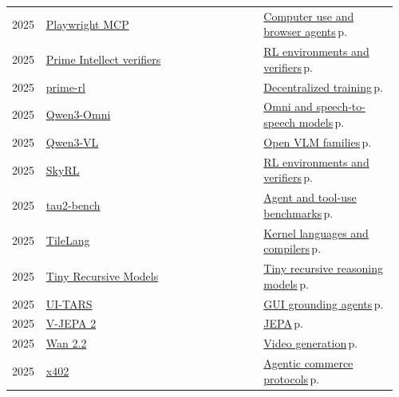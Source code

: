 \documentclass[10pt,a4paper,openany]{report}
\begin{document}
{\begin{longtable}{@{}p{0.07\linewidth}>{\raggedright}p{0.55\linewidth}>{\raggedright\arraybackslash}p{0.34\linewidth}@{}}
2025 & \href{https://github.com/microsoft/playwright-mcp}{Playwright MCP} & \hyperref[c:agents-9]{Computer use and browser agents}\,{\color{muted}\scriptsize p.\,\pageref{c:agents-9}}\\
2025 & \href{https://github.com/PrimeIntellect-ai/verifiers}{Prime Intellect verifiers} & \hyperref[c:reasoning-5]{RL environments and verifiers}\,{\color{muted}\scriptsize p.\,\pageref{c:reasoning-5}}\\
2025 & \href{https://github.com/PrimeIntellect-ai/prime-rl}{prime-rl} & \hyperref[c:training-8]{Decentralized training}\,{\color{muted}\scriptsize p.\,\pageref{c:training-8}}\\
2025 & \href{https://github.com/QwenLM/Qwen3-Omni}{Qwen3-Omni} & \hyperref[c:vlm-7]{Omni and speech-to-speech models}\,{\color{muted}\scriptsize p.\,\pageref{c:vlm-7}}\\
2025 & \href{https://github.com/QwenLM/Qwen3-VL}{Qwen3-VL} & \hyperref[c:vlm-1]{Open VLM families}\,{\color{muted}\scriptsize p.\,\pageref{c:vlm-1}}\\
2025 & \href{https://github.com/NovaSky-AI/SkyRL}{SkyRL} & \hyperref[c:reasoning-5]{RL environments and verifiers}\,{\color{muted}\scriptsize p.\,\pageref{c:reasoning-5}}\\
2025 & \href{https://github.com/sierra-research/tau2-bench}{tau2-bench} & \hyperref[c:evals-5]{Agent and tool-use benchmarks}\,{\color{muted}\scriptsize p.\,\pageref{c:evals-5}}\\
2025 & \href{https://github.com/tile-ai/tilelang}{TileLang} & \hyperref[c:hardware-13]{Kernel languages and compilers}\,{\color{muted}\scriptsize p.\,\pageref{c:hardware-13}}\\
2025 & \href{https://github.com/SamsungSAILMontreal/TinyRecursiveModels}{Tiny Recursive Models} & \hyperref[c:arch-10]{Tiny recursive reasoning models}\,{\color{muted}\scriptsize p.\,\pageref{c:arch-10}}\\
2025 & \href{https://github.com/bytedance/UI-TARS}{UI-TARS} & \hyperref[c:vlm-6]{GUI grounding agents}\,{\color{muted}\scriptsize p.\,\pageref{c:vlm-6}}\\
2025 & \href{https://github.com/facebookresearch/vjepa2}{V-JEPA 2} & \hyperref[c:embodied-3]{JEPA}\,{\color{muted}\scriptsize p.\,\pageref{c:embodied-3}}\\
2025 & \href{https://github.com/Wan-Video/Wan2.2}{Wan 2.2} & \hyperref[c:embodied-6]{Video generation}\,{\color{muted}\scriptsize p.\,\pageref{c:embodied-6}}\\
2025 & \href{https://github.com/coinbase/x402}{x402} & \hyperref[c:protocols-9]{Agentic commerce protocols}\,{\color{muted}\scriptsize p.\,\pageref{c:protocols-9}}\\

\end{longtable}}
\end{document}
